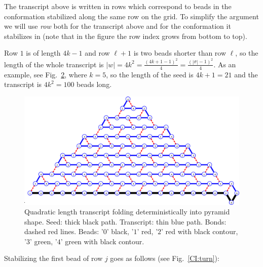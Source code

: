\begin{figure}[h]
\begin{minipage}{.49\textwidth}
	\end{minipage}
	\caption{}
	\label{table:transcript}
\end{figure}

The transcript above is written in rows which correspond to beads in the conformation stabilized along the same row on the grid. To simplify the argument we will use \textit{row} both for the transcript above and for the conformation it stabilizes in (note that in the figure the row index grows from bottom to top). 

Row $1$ is of length $4k-1$ and row $\ell+1$ is two beads shorter than row $\ell$, so the length of the whole transcript is $|w|=4k^2=\frac{(4k+1-1)^2}{4}=\frac{(|\sigma|-1)^2}{4}$. As an example, see Fig.~\ref{CI:big}, where $k=5$, so the length of the seed is $4k+1=21$ and the transcript is $4k^2 = 100$ beads long.

\begin{figure}
	\centering
	\includegraphics[width=0.9\linewidth]{./Fig/CI_Numbers}
	\caption{Quadratic length transcript folding deterministically into pyramid shape. Seed: thick black path. Transcript: thin blue path. Bonds: dashed red lines. Beads: '$0$' black, '$1$' red, '$2$' red with black contour, '$3$' green, '$4$' green with black contour.}
	\label{CI:big}
\end{figure}


Stabilizing the first bead of row $j$ goes as follows (see Fig.~\ref{CI:turn}):

